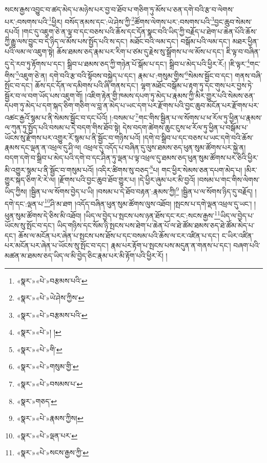 སངས་རྒྱས་འབྱུང་བ་ཚད་མེད་པ་མཉེས་པར་བྱ་བ་ཐོབ་པ་གཅིག་ཏུ་མོས་པ་ཅན་དགེ་བའི་རྩ་བ་ལེགས་པར་:བསགས་པའི་\footnote{«སྣར་»«པེ་»བརྩམས་པའི་}ཕྱིར། བསོད་ནམས་དང་:ཡེ་ཤེས་ཀྱི་\footnote{«སྣར་»«པེ་»ཡེ་ཤེས་ཀྱིས་}ཚོགས་ལེགས་པར་:བསགས་པའི་\footnote{«སྣར་»«པེ་»བརྩམས་པའི་}བྱང་ཆུབ་སེམས་དཔའོ། །གང་དུ་འཇུག་ཅེ་ན་ལྟ་བ་དང་བཅས་པའི་ཆོས་དང་དོན་སྣང་བའི་ཡིད་ཀྱི་བརྗོད་པ་ཐེག་པ་ཆེན་པོའི་ཆོས་ཀྱི་རྒྱུ་ལས་བྱུང་བ་དེ་ཉིད་ལ་མོས་པས་སྤྱོད་པའི་ས་དང་། མཐོང་བའི་ལམ་དང་། བསྒོམ་པའི་ལམ་དང་། མཐར་ཕྱིན་པའི་ལམ་ལ་འཇུག་སྟེ། ཆོས་ཐམས་ཅད་རྣམ་པར་རིག་པ་ཙམ་དུ་རྗེས་སུ་སྒྲོགས་པ་ལ་མོས་པ་དང་། ཇི་ལྟ་བ་བཞིན་དུ་དེ་རབ་ཏུ་རྟོགས་པ་དང་། སྒྲིབ་པ་ཐམས་ཅད་ཀྱི་གཉེན་པོ་སྒོམ་པ་དང་། སྒྲིབ་པ་མེད་པའི་ཕྱིར་རོ:། །ཇི་ལྟར་\footnote{«སྣར་»«པེ་»། །}གང་གིས་\footnote{«སྣར་»«པེ་»གི་}འཇུག་ཅེ་ན། དགེ་བའི་རྩ་བའི་སྟོབས་བསྐྱེད་པ་དང་། རྣམ་པ་:གསུམ་གྱིས་\footnote{«སྣར་»«པེ་»གསུམ་གྱི་}སེམས་སྦྱོང་བ་དང་། གནས་བཞི་སྤོང་བ་དང་། ཆོས་དང་དོན་ལ་དམིགས་པའི་ཞི་གནས་དང་། ལྷག་མཐོང་བསྒོམ་པ་རྟག་ཏུ་དང་གུས་པར་བྱས་ཏེ་སྦྱོར་བ་ལ་བག་ཡོད་པས་འཇུག་གོ། །འཇིག་རྟེན་གྱི་ཁམས་དཔག་ཏུ་མེད་པ་རྣམས་ཀྱི་མིར་གྱུར་པའི་སེམས་ཅན་དཔག་ཏུ་མེད་པ་དག་སྐད་ཅིག་གཅིག་ལ་བླ་ན་མེད་པ་ཡང་དག་པར་རྫོགས་པའི་བྱང་ཆུབ་མངོན་པར་རྫོགས་པར་འཚང་རྒྱའོ་སྙམ་པ་ནི་སེམས་སྦྱོང་བ་དང་པོའོ། །:བསམ་པ་\footnote{«སྣར་»«པེ་»བསམས་པ་}གང་གིས་སྦྱིན་པ་ལ་སོགས་པ་ཕ་རོལ་ཏུ་ཕྱིན་པ་རྣམས་ལ་ཀུན་ཏུ་སྤྱོད་པའི་བསམ་པ་དེ་བདག་གིས་ཐོབ་སྟེ། དེས་བདག་ཚེགས་ཆུང་ངུས་ཕ་རོལ་ཏུ་ཕྱིན་པ་བསྒོམ་པ་ཡོངས་སུ་རྫོགས་པར་འགྱུར་རོ་སྙམ་པ་ནི་སྦྱོང་བ་གཉིས་པའོ། །དགེ་བ་སྒྲིབ་པ་དང་བཅས་པ་ཡང་དགེ་བའི་ཆོས་རྣམས་དང་ལྡན་ན་འཕྲལ་དུ་ཤི་ལ། འཕྲལ་དུ་འདོད་པ་བཞིན་དུ་ལུས་ཐམས་ཅད་ཕུན་སུམ་ཚོགས་པར་སྐྱེ་ན། བདག་དགེ་བ་སྒྲིབ་པ་མེད་པའི་དགེ་བ་དང་ཤིན་ཏུ་ལྡན་པ་ལྟ་འཕྲལ་དུ་ཐམས་ཅད་ཕུན་སུམ་ཚོགས་པར་ཅིའི་ཕྱིར་མི་འགྱུར་སྙམ་པ་ནི་སྦྱོང་བ་གསུམ་པའོ། །འདིར་ཚིགས་སུ་བཅད་\footnote{«སྣར་»གཅད་}པ། གང་ཕྱིར་སེམས་ཅན་དཔག་མེད་པ། །མིར་གྱུར་སྐད་ཅིག་རེ་རེ་ལ། །རྫོགས་པའི་བྱང་ཆུབ་ཐོབ་གྱུར་པ། །དེ་ཕྱིར་ཞུམ་པར་མི་བྱའོ། །བསམ་པ་གང་གིས་ལེགས་ཡིད་ཀྱིས། །སྦྱིན་པ་ལ་སོགས་བྱེད་པ་ཡི། །བསམ་པ་དེ་ཐོབ་བརྟན་:རྣམས་ཀྱི།\footnote{«སྣར་»«པེ་»རྣམས་ཀྱིས།} །སྦྱིན་པ་ལ་སོགས་ཉིད་དུ་བརྗོད། །དགེ་དང་:ལྡན་པ་\footnote{«སྣར་»«པེ་»ལྡན་པར་}ཤི་མ་ཐག །འདོད་བཞིན་ཕུན་སུམ་ཚོགས་ལུས་འཐོབ། །སྤངས་པ་དགེ་ལྡན་འཕྲལ་དུ་ཡང་། །ཕུན་སུམ་ཚོགས་དེ་ཅིས་མི་འཐོབ། །ཡིད་ལ་བྱེད་པ་སྤངས་པས་ཉན་ཐོས་དང་རང་:སངས་རྒྱས་\footnote{«སྣར་»«པེ་»སངས་རྒྱས་ཀྱི་}ཡིད་ལ་བྱེད་པ་ཡོངས་སུ་སྤོང་བ་དང་། ཡིད་གཉིས་དང་སོམ་ཉི་སྤངས་པས་ཐེག་པ་ཆེན་པོ་ལ་ཐེ་ཚོམ་ཐམས་ཅད་ཐེ་ཚོམ་མེད་པ་དང་། ཆོས་ལ་མངོན་པར་ཞེན་པ་སྤངས་པས་ཐོས་པ་དང་བསམ་པའི་ཆོས་ལ་ངར་འཛིན་པ་དང་། ང་ཡིར་འཛིན་པར་མངོན་པར་ཞེན་པ་ཡོངས་སུ་སྤོང་བ་དང་། རྣམ་པར་རྟོག་པ་སྤངས་པས་མདུན་ན་གནས་པ་དང་། བཞག་པའི་མཚན་མ་ཐམས་ཅད་ཡིད་ལ་མི་བྱེད་ཅིང་རྣམ་པར་མི་རྟོག་པའི་ཕྱིར་རོ། །
